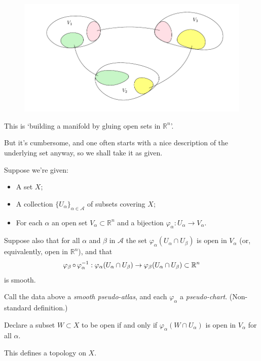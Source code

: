\documentclass[a4paper,11pt]{article}
\begin{document}
	\begin{figure}[H]
		\centering
		\includegraphics[width=\linewidth]{fig/fig5.pdf}
	\end{figure}

	This is `building a manifold by gluing open sets in $\mathbb{R}^n$'.

	But it's cumbersome, and one often starts with a nice description of the underlying set anyway, so we shall take it as given.

	Suppose we're given:
	\begin{itemize}
		\item A set $X$;
		\item A collection $\{U_\alpha\}_{\alpha\in \mathcal{A}}$ of subsets covering $X$;
		\item For each $\alpha$ an open set $V_\alpha \subset \mathbb{R}^n$ and a bijection $\varphi_\alpha : U_\alpha \to V_\alpha$.
	\end{itemize}
	Suppose also that for all $\alpha$ and $\beta$ in $\mathcal{A}$ the set $\varphi_\alpha(U_\alpha \cap U_\beta)$ is open in $V_\alpha$ (or, equivalently, open in $\mathbb{R}^n$), and that
	\[
		\varphi_\beta \operatorname{\circ} \varphi_\alpha^{-1} : \varphi_\alpha(U_\alpha \cap U_\beta) \to \varphi_\beta (U_\alpha \cap U_\beta) \subset \mathbb{R}^n
	\]
	is smooth.

	\begin{defi}
		Call the data above a \emph{smooth pseudo-atlas}, and each $\varphi_\alpha$ a \emph{pseudo-chart}. (Non-standard definition.)
	\end{defi}

	Declare a subset $W \subset X$ to be open if and only if $\varphi_\alpha(W\cap U_\alpha)$ is open in $V_\alpha$ for all $\alpha$.

	\begin{lem}
		This defines a topology on $X$.
	\end{lem}
\end{document}
